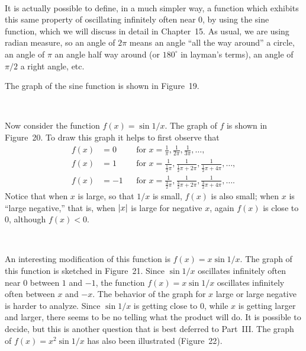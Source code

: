 \begin{center}
\\[0.6em]
\end{center}

It is actually possible to define, in a much simpler way, a function which
exhibits this same property of oscillating infinitely often near $0$, by using
the sine function, which we will discuss in detail in Chapter~15. As usual, we
are using radian measure, so an angle of $2\pi$ means an angle ``all the way
around'' a circle, an angle of $\pi$ an angle half way around (or $180^\circ$ in
layman's terms), an angle of $\pi/2$ a right angle, etc.

The graph of the sine function is shown in Figure~19.

\begin{center}
\\[0.6em]
\end{center}

Now consider the function $f(x)=\sin 1/x$. The graph of $f$ is shown in
Figure~20. To draw this graph it helps to first observe that
\begin{align*}
f(x)&=0 && \text{for }x=\frac1\pi,\frac1{2\pi},\frac1{3\pi},\dots,\\
f(x)&=1 && \text{for }x=\frac1{\frac12\pi},\frac1{\frac12\pi+2\pi},\frac1{\frac12\pi+4\pi},\dots,\\
f(x)&=-1 && \text{for }x=\frac1{\frac32\pi},\frac1{\frac32\pi+2\pi},\frac1{\frac32\pi+4\pi},\dots.
\end{align*}
Notice that when $x$ is large, so that $1/x$ is small, $f(x)$ is also small;
when $x$ is ``large negative,'' that is, when $\lvert x\rvert$ is large for
negative $x$, again $f(x)$ is close to $0$, although $f(x)<0$.

\begin{center}
\\[0.6em]
\end{center}

An interesting modification of this function is $f(x)=x\sin 1/x$. The graph of
this function is sketched in Figure~21. Since $\sin 1/x$ oscillates infinitely
often near $0$ between $1$ and $-1$, the function $f(x)=x\sin 1/x$ oscillates
infinitely often between $x$ and $-x$. The behavior of the graph for $x$ large
or large negative is harder to analyze. Since $\sin 1/x$ is getting close to
$0$, while $x$ is getting larger and larger, there seems to be no telling what
the product will do. It is possible to decide, but this is another question
that is best deferred to Part~III. The graph of $f(x)=x^2\sin 1/x$ has also
been illustrated (Figure~22).


